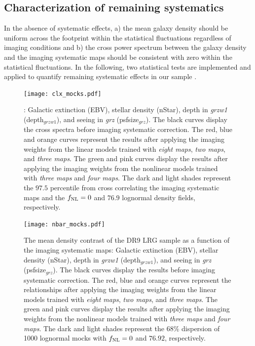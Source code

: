 \subsection{Characterization of remaining systematics}
\label{ssec:characterization}
In the absence of systematic effects, a) the mean galaxy density should be uniform across the footprint within the statistical fluctuations regardless of imaging conditions and b) the cross power spectrum between the galaxy density and the imaging systematic maps should be consistent with zero within the statistical fluctuations. In the following, two statistical tests are implemented and applied to quantify remaining systematic effects in our sample \cite[see, also,][]{rezaie2021primordial}.

\begin{figure}
\centering
\texttt{[image: clx\_mocks.pdf]}
\caption{: Galactic extinction (EBV), stellar density (nStar), depth in \textit{grzw1} (depth$_{grzw1}$), and seeing in \textit{grz} (psfsize$_{grz}$). The black curves display the cross spectra before imaging systematic correction. The red, blue and orange curves represent the results after applying the imaging weights from the linear models trained with \textit{eight maps}, \textit{two maps}, and \textit{three maps}. The green and pink curves display the results after applying the imaging weights from the nonlinear models trained with \textit{three maps} and \textit{four maps}. The dark and light shades represent the $97.5$ percentile from cross correlating the imaging systematic maps and the $f_{\rm NL}=0$ and $76.9$ lognormal density fields, respectively.}\label{fig:clxmock}
\end{figure}

\begin{figure}
\centering
\texttt{[image: nbar\_mocks.pdf]}
\caption{The mean density contrast of the DR9 LRG sample as a function of the imaging systematic maps: Galactic extinction (EBV), stellar density (nStar), depth in \textit{grzw1} (depth$_{grzw1}$), and seeing in \textit{grz} (psfsize$_{grz}$). The black curves display the results before imaging systematic correction. The red, blue and orange curves represent the relationships after applying the imaging weights from the linear models trained with \textit{eight maps}, \textit{two maps}, and \textit{three maps}. The green and pink curves display the results after applying the imaging weights from the nonlinear models trained with \textit{three maps} and \textit{four maps}. The dark and light shades represent the $68\%$ dispersion of 1000 lognormal mocks with $f_{\rm NL}=0$ and $76.92$, respectively.}\label{fig:nbarmock}
\end{figure}


